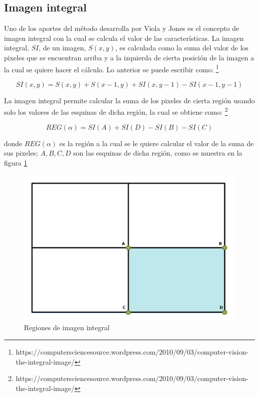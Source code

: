 

\subsection{Imagen integral}\label{subsec:IntegralImage} 

Uno de los aportes del método desarrolla por Viola y Jones es el concepto de imagen integral con la cual se calcula el valor de las características. La imagen integral, $SI$, de un imagen, $S(x,y)$, es calculada como la suma del valor de los pixeles que se encuentran arriba y a la izquierda de cierta posición de la imagen a la cual se quiere hacer el cálculo. Lo anterior se puede escribir como: \footnote{https://computersciencesource.wordpress.com/2010/09/03/computer-vision-the-integral-image/}     

$$SI(x,y)=S(x,y) + S(x-1,y) + SI(x,y-1)-SI(x-1,y-1)$$

La imagen integral permite calcular la suma de los pixeles de cierta región usando solo los valores de las esquinas de dicha región, la cual se obtiene como: \footnote{https://computersciencesource.wordpress.com/2010/09/03/computer-vision-the-integral-image/}   

$$REG(\alpha)=SI(A)+SI(D)-SI(B)-SI(C)$$

donde $REG(\alpha)$ es la región a la cual se le quiere calcular el valor de la suma de sus pixeles; $A,B,C,D$ son las esquinas de dicha región, como se muestra en la figura \ref{fig:figImageIntegral}

\begin{figure}[!h]
\begin{center}
\includegraphics[scale=.3]{./Figures/IntegralImage.png}
\end{center}
\caption{Regiones de imagen integral}
\label{fig:figImageIntegral}
\end{figure} 


